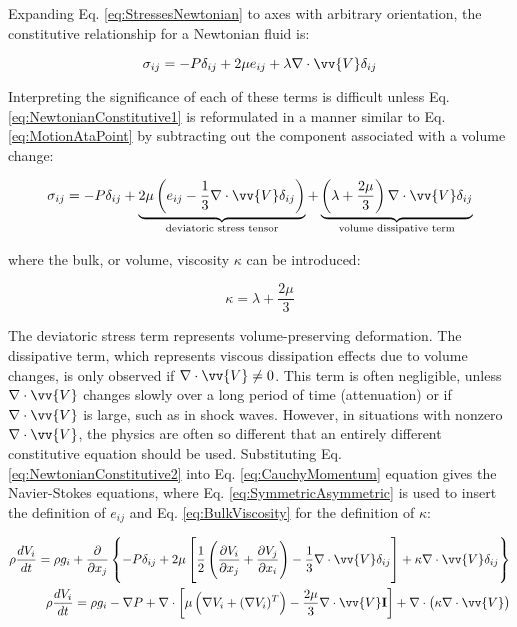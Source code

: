 \documentclass[10pt]{article}
\numberwithin{equation}{section} %
\begin{document}
Expanding Eq. \eqref{eq:StressesNewtonian} to axes with arbitrary orientation, the constitutive relationship for a Newtonian fluid is:

\begin{equation}
\label{eq:NewtonianConstitutive1}
\sigma_{ij}=-P\delta_{ij}+2\mu e_{ij}+\lambda\nabla\cdot\vv{V}\delta_{ij}
\end{equation}

Interpreting the significance of each of these terms is difficult unless Eq. \eqref{eq:NewtonianConstitutive1} is reformulated in a manner similar to Eq. \eqref{eq:MotionAtaPoint} by subtracting out the component associated with a volume change:

\begin{equation}
\label{eq:NewtonianConstitutive2}
\sigma_{ij}=-P\delta_{ij}+\underbrace{2\mu\left(e_{ij}-\frac{1}{3}\nabla\cdot\vv{V}\delta_{ij}\right)}_\text{deviatoric stress tensor}+\underbrace{\left(\lambda+\frac{2\mu}{3}\right)\nabla\cdot\vv{V}\delta_{ij}}_\text{volume dissipative term}
\end{equation}

where the bulk, or volume, viscosity \(\kappa\) can be introduced:

\begin{equation}
\label{eq:BulkViscosity}
\kappa=\lambda+\frac{2\mu}{3}
\end{equation}

The deviatoric stress term represents volume-preserving deformation. The dissipative term, which represents viscous dissipation effects due to volume changes, is only observed if \(\nabla\cdot\vv{V}\neq 0\). This term is often negligible, unless \(\nabla\cdot\vv{V}\) changes slowly over a long period of time (attenuation) or if \(\nabla\cdot\vv{V}\) is large, such as in shock waves. However, in situations with nonzero \(\nabla\cdot\vv{V}\), the physics are often so different that an entirely different constitutive equation should be used. Substituting Eq. \eqref{eq:NewtonianConstitutive2} into Eq. \eqref{eq:CauchyMomentum} equation gives the Navier-Stokes equations, where Eq. \eqref{eq:SymmetricAsymmetric} is used to insert the definition of \(e_{ij}\) and Eq. \eqref{eq:BulkViscosity} for the definition of \(\kappa\):

\begin{equation}
\label{eq:NSFullForm}
\begin{aligned}
\rho\frac{dV_i}{dt}=\rho g_i+\frac{\partial}{\partial x_j}\left\{-P\delta_{ij}+2\mu\left\lbrack\frac{1}{2}\left(\frac{\partial V_i}{\partial x_j}+\frac{\partial V_j}{\partial x_i}\right)-\frac{1}{3}\nabla\cdot\vv{V}\delta_{ij}\right\rbrack+\kappa\nabla\cdot\vv{V}\delta_{ij}\right\}\\
\rho\frac{dV_i}{dt}=\rho g_i-\nabla P+\nabla\cdot\left\lbrack\mu\left(\nabla V_i+(\nabla V_i)^T\right)-\frac{2\mu}{3}\nabla\cdot\vv{V}\textbf{I}\right\rbrack+\nabla\cdot\left(\kappa\nabla\cdot\vv{V}\right)\\
\end{aligned}
\end{equation}
\end{document}
